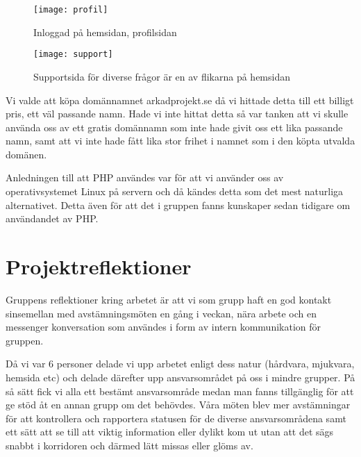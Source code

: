 \documentclass[12pt,fleqn,openany]{book} %
\begin{document}
\begin{figure}[h]
\centering\texttt{[image: profil]}
\caption{Inloggad på hemsidan, profilsidan}
\label{fig_profilsida}
\end{figure}

\begin{figure}[!h]
\centering\texttt{[image: support]}
\caption{Supportsida för diverse frågor är en av flikarna på hemsidan}
\label{fig_support}
\end{figure}

Vi valde att köpa domännamnet arkadprojekt.se då vi hittade detta till ett billigt pris, ett väl passande namn. Hade vi inte hittat
detta så var tanken att vi skulle använda oss av ett gratis domännamn som inte hade givit oss ett lika passande namn, samt att vi inte
hade fått lika stor frihet i namnet som i den köpta utvalda domänen.  

Anledningen till att PHP användes var för att vi använder oss av operativsystemet Linux på servern och då kändes detta som det mest 
naturliga alternativet. Detta även för att det i gruppen fanns kunskaper sedan tidigare om användandet av PHP.


\chapter{Projektreflektioner}

Gruppens reflektioner kring arbetet är att vi som grupp haft en god kontakt sinsemellan med avstämningsmöten en gång i veckan, nära 
arbete och en messenger konversation som användes i form av intern kommunikation för gruppen.

Då vi var 6 personer delade vi upp arbetet enligt dess natur (hårdvara, mjukvara, hemsida etc) och delade därefter upp ansvarsområdet 
på oss i mindre grupper. På så sätt fick vi alla ett bestämt ansvarsområde medan man fanns tillgänglig för att ge stöd åt en annan 
grupp om det behövdes. Våra möten blev mer avstämningar för att kontrollera och rapportera statusen för de diverse ansvarsområdena 
samt ett sätt att se till att viktig information eller dylikt kom ut utan att det sägs snabbt i korridoren och därmed lätt missas 
eller glöms av.
\end{document}

